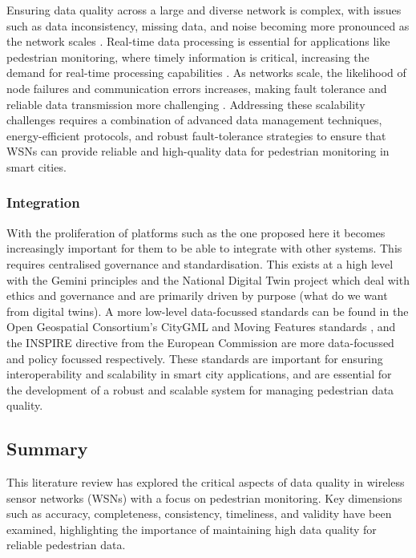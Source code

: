 Ensuring data quality across a large and diverse network is complex, with issues such as data inconsistency, missing data, and noise becoming more pronounced as the network scales \cite{karkouchDataQualityInternet2016}. Real-time data processing is essential for applications like pedestrian monitoring, where timely information is critical, increasing the demand for real-time processing capabilities \cite{ahmadUnsupervisedRealtimeAnomaly2017}. As networks scale, the likelihood of node failures and communication errors increases, making fault tolerance and reliable data transmission more challenging \cite{younisStrategiesTechniquesNode2008}. Addressing these scalability challenges requires a combination of advanced data management techniques, energy-efficient protocols, and robust fault-tolerance strategies to ensure that WSNs can provide reliable and high-quality data for pedestrian monitoring in smart cities.

\subsubsection{Integration}
With the proliferation of platforms such as the one proposed here it becomes increasingly important for them to be able to integrate with other systems. This requires centralised governance and standardisation. This exists at a high level with the Gemini principles \citep{waltersGeminiPrinciples2019} and the National Digital Twin project \citep{NationalDigitalTwin2024} which deal with ethics and governance and are primarily driven by purpose (what do we want from digital twins). A more low-level data-focussed standards can be found in the Open Geospatial Consortium's CityGML and Moving Features standards \citep{OGCMovingFeatures2024,CityGML2024}, and the INSPIRE directive \citep{INSPIREKnowledgeBase2024} from the European Commission are more data-focussed and policy focussed respectively. These standards are important for ensuring interoperability and scalability in smart city applications, and are essential for the development of a robust and scalable system for managing pedestrian data quality.

\subsection{Summary}

This literature review has explored the critical aspects of data quality in wireless sensor networks (WSNs) with a focus on pedestrian monitoring. Key dimensions such as accuracy, completeness, consistency, timeliness, and validity have been examined, highlighting the importance of maintaining high data quality for reliable pedestrian data.

